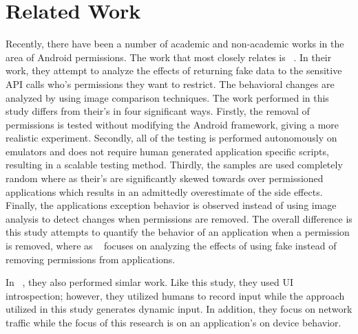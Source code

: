 \chapter{Related Work}
\label{sec:related}
Recently, there have been a number of academic and non-academic works in the area of Android permissions. The work that most closely relates is ~\cite{Hornyack:2011:TAD:2046707.2046780}. In their work, they attempt to analyze the effects of returning fake data to the sensitive API calls who's permissions they want to restrict. The behavioral changes are analyzed by using image comparison techniques. The work performed in this study differs from their's 
in four significant ways. Firstly, the removal of permissions is tested without modifying the Android framework, giving a more realistic  experiment. Secondly, all of the testing is performed autonomously on emulators and does not require human generated application specific scripts, resulting in a scalable testing method. Thirdly,  the samples are used completely random where as their's are significantly skewed towards over permissioned applications which results in an admittedly overestimate of the side effects. Finally, the applications exception behavior is observed instead of using image analysis to detect changes when permissions are removed.  The overall difference is this study attempts to quantify the behavior of an application when a permission is removed, where as ~\cite{Hornyack:2011:TAD:2046707.2046780} focuses on analyzing the effects of using fake instead of removing permissions from applications.   

In ~\cite{Rastogi:2013:AAS:2435349.2435379}, they also performed simlar work.  Like this study, they used UI introspection; however, they utilized humans to record input while the approach utilized in this study generates dynamic input.  In addition, they focus on network traffic while the focus of this research is on an application's on device behavior.  


